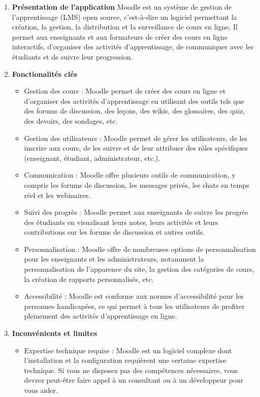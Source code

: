 \begin{enumerate}
    \item \textbf{Présentation de l'application} \newline Moodle est un système de gestion de l'apprentissage (LMS) open source, c'est-à-dire un logiciel permettant la création, la gestion, la distribution et la surveillance de cours en ligne. Il permet aux enseignants et aux formateurs de créer des cours en ligne interactifs, d'organiser des activités d'apprentissage, de communiquer avec les étudiants et de suivre leur progression.
    \item \textbf{Fonctionalités clés} 
        \begin{itemize}
            \item Gestion des cours : Moodle permet de créer des cours en ligne et d'organiser des activités d'apprentissage en utilisant des outils tels que des forums de discussion, des leçons, des wikis, des glossaires, des quiz, des devoirs, des sondages, etc.
            \item Gestion des utilisateurs : Moodle permet de gérer les utilisateurs, de les inscrire aux cours, de les suivre et de leur attribuer des rôles spécifiques (enseignant, étudiant, administrateur, etc.).
            \item Communication : Moodle offre plusieurs outils de communication, y compris les forums de discussion, les messages privés, les chats en temps réel et les webinaires.
            \item Suivi des progrès : Moodle permet aux enseignants de suivre les progrès des étudiants en visualisant leurs notes, leurs activités et leurs contributions sur les forums de discussion et autres outils.
            \item Personnalisation : Moodle offre de nombreuses options de personnalisation pour les enseignants et les administrateurs, notamment la personnalisation de l'apparence du site, la gestion des catégories de cours, la création de rapports personnalisés, etc.
            \item Accessibilité : Moodle est conforme aux normes d'accessibilité pour les personnes handicapées, ce qui permet à tous les utilisateurs de profiter pleinement des activités d'apprentissage en ligne.
        \end{itemize}
    \item \textbf{Inconvénients et limites}
        \begin{itemize}
            \item Expertise technique requise : Moodle est un logiciel complexe dont l'installation et la configuration requièrent une certaine expertise technique. Si vous ne disposez pas des compétences nécessaires, vous devrez peut-être faire appel à un consultant ou à un développeur pour vous aider.

\end{itemize}
\end{enumerate}
